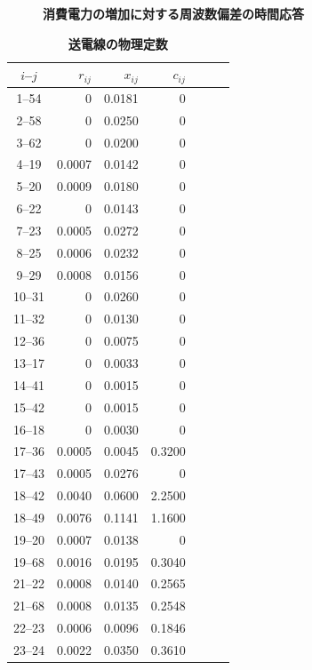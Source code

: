 \documentclass[tombow,dvipdfmx]{corona-a5-1.1}
\begin{document}
\begin{figure}[t]
{\begin{minipage}{0.49\linewidth}
  \end{minipage}
  \medskip
  \caption{\textbf{消費電力の増加に対する周波数偏差の時間応答} }
  \label{fig:agcPdemo}
  }
\medskip
\end{figure}



\begin{table}[h]
\medskip
\caption{\textbf{送電線の物理定数}} \label{table:ieee68lines}
 \centering
  {
  \begin{minipage}{0.49\linewidth}
    \centering
  \begin{tabular}{crrrrcc}
   \hline
$i$--$j$ & $r_{ij}$  &  $x_{ij}$ & $c_{ij}$ \\
   \hline \hline
1--54  & 0 & 0.0181 & 0 \\
2--58  & 0 & 0.0250 & 0 \\
3--62  & 0 & 0.0200 & 0 \\
4--19  & 0.0007 & 0.0142 & 0 \\
5--20  & 0.0009 & 0.0180 & 0 \\
6--22  & 0 & 0.0143 & 0 \\
7--23  & 0.0005 & 0.0272 & 0 \\
8--25  & 0.0006 & 0.0232 & 0 \\
9--29  & 0.0008 & 0.0156 & 0 \\
10--31  & 0 & 0.0260 & 0 \\
11--32  & 0 & 0.0130 & 0 \\
12--36  & 0 & 0.0075 & 0 \\
13--17  & 0 & 0.0033 & 0 \\
14--41  & 0 & 0.0015 & 0 \\
15--42  & 0 & 0.0015 & 0 \\
16--18  & 0 & 0.0030 & 0 \\
17--36  & 0.0005 & 0.0045 & 0.3200 \\
17--43  & 0.0005 & 0.0276 & 0 \\
18--42  & 0.0040 & 0.0600 & 2.2500 \\
18--49  & 0.0076 & 0.1141 & 1.1600 \\
19--20  & 0.0007 & 0.0138 & 0 \\
19--68  & 0.0016 & 0.0195 & 0.3040 \\
21--22  & 0.0008 & 0.0140 & 0.2565 \\
21--68  & 0.0008 & 0.0135 & 0.2548 \\
22--23  & 0.0006 & 0.0096 & 0.1846 \\
23--24  & 0.0022 & 0.0350 & 0.3610 \\

\end{tabular}
\end{minipage}}
\end{table}
\end{document}
